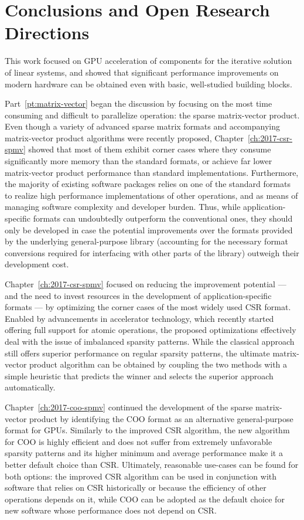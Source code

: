 \section{Conclusions and Open Research Directions}

This work focused on GPU acceleration of components for the iterative solution
of linear systems, and showed that significant performance improvements on
modern hardware can be obtained even with basic, well-studied building
blocks.

Part~\ref{pt:matrix-vector} began the discussion by focusing on the most time
consuming and difficult to parallelize operation: the sparse matrix-vector
product. Even though a variety of advanced sparse matrix formats and
accompanying matrix-vector product algorithms were recently proposed,
Chapter~\ref{ch:2017-csr-spmv} showed that most of them exhibit corner cases
where they consume significantly more memory than the standard formats, or
achieve far lower matrix-vector product performance than standard
implementations. Furthermore, the majority of existing software packages relies
on one of the standard formats to realize high performance implementations of
other operations, and as means of managing software complexity and developer
burden. Thus, while application-specific formats can undoubtedly outperform the
conventional ones, they should only be developed in case the potential
improvements over the formats provided by the underlying general-purpose library
(accounting for the necessary format conversions required for interfacing with
other parts of the library) outweigh their development cost.

Chapter~\ref{ch:2017-csr-spmv} focused on reducing the improvement potential ---
and the need to invest resources in the development of application-specific
formats --- by optimizing the corner cases of the most widely used CSR format.
Enabled by advancements in accelerator technology, which recently started
offering full support for atomic operations, the proposed optimizations
effectively deal with the issue of imbalanced sparsity patterns.  While the
classical approach still offers superior performance on regular sparsity
patterns, the ultimate matrix-vector product algorithm can be obtained by
coupling the two methods with a simple heuristic that predicts the winner and
selects the superior approach automatically.

Chapter~\ref{ch:2017-coo-spmv} continued the development of the sparse
matrix-vector product by identifying the COO format as an alternative
general-purpose format for GPUs. Similarly to the improved CSR algorithm, the
new algorithm for COO is highly efficient and does not suffer from extremely
unfavorable sparsity patterns and its higher minimum and average performance
make it a better default choice than CSR. Ultimately, reasonable use-cases can
be found for both options: the improved CSR algorithm can be used in conjunction
with software that relies on CSR historically or because the efficiency of other
operations depends on it, while COO can be adopted as the default choice for new
software whose performance does not depend on CSR.

